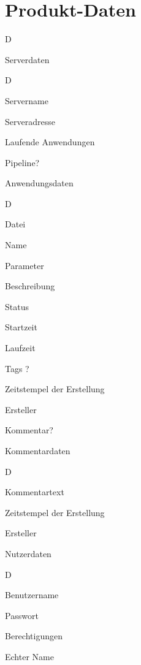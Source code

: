 \section{Produkt-Daten}


\begin{enumPH}{D}
	\item \label{server_daten}Serverdaten
	\begin{subenumPH}{D}
		\item Servername
		\item Serveradresse
		\item Laufende Anwendungen
		\item Pipeline?
	\end{subenumPH}

    \item \label{anwendungs_daten}Anwendungsdaten
    \begin{subenumPH}{D}
    	\item Datei
        \item Name
        \item Parameter
        \item Beschreibung
        \item Status
        \item Startzeit
        \item Laufzeit
        \item Tags ?
        \item Zeitstempel der Erstellung
        \item \label{experiment_ersteller}Ersteller
        \item Kommentar?
    \end{subenumPH}

    \item \label{kommentar_daten}Kommentardaten
    \begin{subenumPH}{D}
        \item Kommentartext
        \item Zeitstempel der Erstellung
        \item \label{kommentar_ersteller}Ersteller
    \end{subenumPH}

    \item \label{nutzer_daten}Nutzerdaten
    \begin{subenumPH}{D}
        \item Benutzername
        \item Passwort
        \item Berechtigungen
        \item Echter Name
    \end{subenumPH}
\end{enumPH}
\newpage
